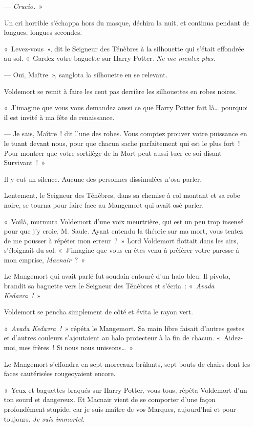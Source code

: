 --- \emph{Crucio.}~»

Un cri horrible s'échappa hors du masque, déchira la nuit, et continua pendant de longues, longues secondes.

«~Levez-vous~», dit le Seigneur des Ténèbres à la silhouette qui s'était effondrée au sol.
«~Gardez votre baguette sur Harry Potter.
\emph{Ne me mentez plus.}

--- Oui, Maître~», sanglota la silhouette en se relevant.

Voldemort se remit à faire les cent pas derrière les silhouettes en robes noires.

«~J'imagine que vous vous demandez aussi ce que Harry Potter fait là… pourquoi il est invité à ma fête de renaissance.

--- Je sais, Maître~! dit l'une des robes.
Vous comptez prouver votre puissance en le tuant devant nous, pour que chacun sache parfaitement qui est le plus fort~!
Pour montrer que votre sortilège de la Mort peut aussi tuer ce soi-disant Survivant~!~»

Il y eut un silence.
Aucune des personnes dissimulées n'osa parler.

Lentement, le Seigneur des Ténèbres, dans sa chemise à col montant et sa robe noire, se tourna pour faire face au Mangemort qui avait osé parler.

«~Voilà, murmura Voldemort d'une voix meurtrière, qui est un peu trop insensé pour que j'y croie, M. Saule.
Ayant entendu la théorie sur ma mort, vous tentez de me pousser à répéter mon erreur~?~»
Lord Voldemort flottait dans les airs, s'éloignait du sol.
«~J'imagine que vous en êtes venu à préférer votre paresse à mon emprise, \emph{Macnair}~?~»

Le Mangemort qui avait parlé fut soudain entouré d'un halo bleu.
Il pivota, brandit sa baguette vers le Seigneur des Ténèbres et s'écria~: «~\emph{Avada Kedavra~!}~»

Voldemort se pencha simplement de côté et évita le rayon vert.

«~\emph{Avada Kedavra~!}~» répéta le Mangemort.
Sa main libre faisait d'autres gestes et d'autres couleurs s'ajoutaient au halo protecteur à la fin de chacun.
«~Aidez-moi, mes frères~!
Si nous nous unissons…~»

Le Mangemort s'effondra en sept morceaux brûlants, sept bouts de chairs dont les faces cautérisées rougeoyaient encore.

«~Yeux et baguettes braqués sur Harry Potter, vous tous, répéta Voldemort d'un ton sourd et dangereux.
Et Macnair vient de se comporter d'une façon profondément stupide, car je suis maître de vos Marques, aujourd'hui et pour toujours.
\emph{Je suis immortel.}

